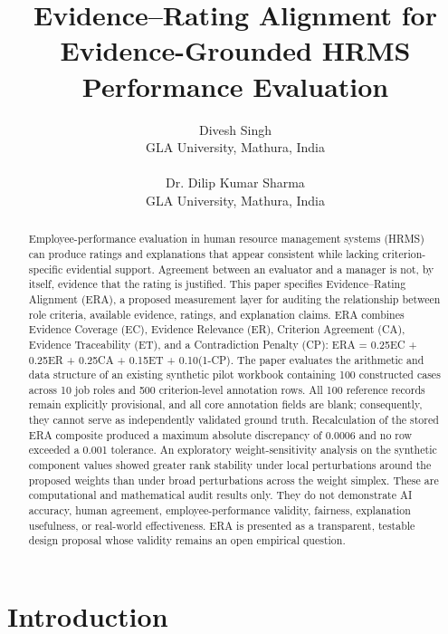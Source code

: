 \documentclass[
  10pt,
  a4paper,
  runningheads]{llncs}
\title{Evidence--Rating Alignment for Evidence-Grounded HRMS Performance Evaluation}
\author{Divesh Singh\\
GLA University, Mathura, India\\
\email{divesh.singh\_phd.cs24@gla.ac.in}\\[8pt]
Dr. Dilip Kumar Sharma\\
GLA University, Mathura, India\\
\email{dilip.sharma@gla.ac.in}}
\institute{}
\date{}
\begin{document}
\setlength{\parskip}{0pt}
\setlength{\parindent}{1em}
\maketitle
\begin{abstract}

Employee-performance evaluation in human resource management systems
(HRMS) can produce ratings and explanations that appear consistent while
lacking criterion-specific evidential support. Agreement between an
evaluator and a manager is not, by itself, evidence that the rating is
justified. This paper specifies Evidence--Rating Alignment (ERA), a
proposed measurement layer for auditing the relationship between role
criteria, available evidence, ratings, and explanation claims. ERA
combines Evidence Coverage (EC), Evidence Relevance (ER), Criterion
Agreement (CA), Evidence Traceability (ET), and a Contradiction Penalty
(CP): ERA = 0.25EC + 0.25ER + 0.25CA + 0.15ET + 0.10(1-CP). The paper
evaluates the arithmetic and data structure of an existing synthetic
pilot workbook containing 100 constructed cases across 10 job roles and
500 criterion-level annotation rows. All 100 reference records remain
explicitly provisional, and all core annotation fields are blank;
consequently, they cannot serve as independently validated ground truth.
Recalculation of the stored ERA composite produced a maximum absolute
discrepancy of 0.0006 and no row exceeded a 0.001 tolerance. An
exploratory weight-sensitivity analysis on the synthetic component
values showed greater rank stability under local perturbations around
the proposed weights than under broad perturbations across the weight
simplex. These are computational and mathematical audit results only.
They do not demonstrate AI accuracy, human agreement,
employee-performance validity, fairness, explanation usefulness, or
real-world effectiveness. ERA is presented as a transparent, testable
design proposal whose validity remains an open empirical question.

\end{abstract}

\section{Introduction}\label{introduction}
\end{document}

